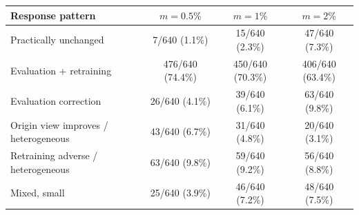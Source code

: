 \begin{tabular}{@{}lccc@{}}
\toprule
Response pattern & $m=0.5\%$ & $m=1\%$ & $m=2\%$ \\
\midrule
Practically unchanged & 7/640 (1.1\%) & 15/640 (2.3\%) & 47/640 (7.3\%) \\
Evaluation + retraining & 476/640 (74.4\%) & 450/640 (70.3\%) & 406/640 (63.4\%) \\
Evaluation correction & 26/640 (4.1\%) & 39/640 (6.1\%) & 63/640 (9.8\%) \\
Origin view improves / heterogeneous & 43/640 (6.7\%) & 31/640 (4.8\%) & 20/640 (3.1\%) \\
Retraining adverse / heterogeneous & 63/640 (9.8\%) & 59/640 (9.2\%) & 56/640 (8.8\%) \\
Mixed, small & 25/640 (3.9\%) & 46/640 (7.2\%) & 48/640 (7.5\%) \\
\bottomrule
\end{tabular}
